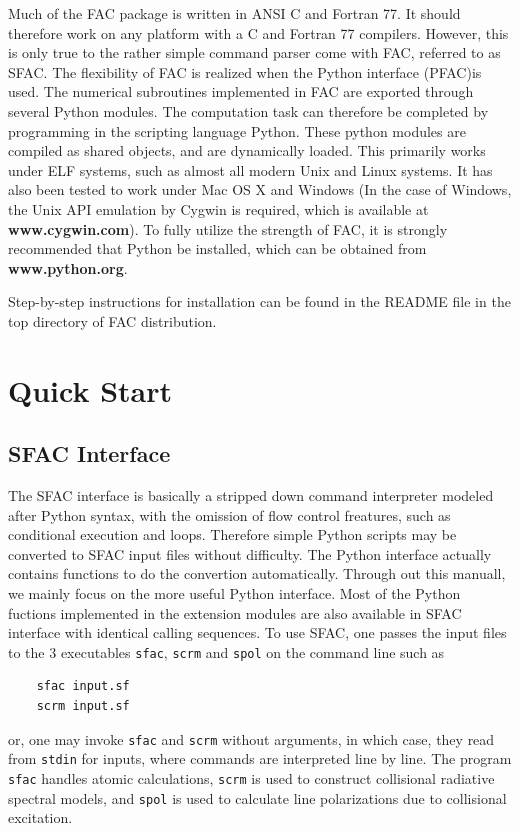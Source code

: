 \documentclass[twoside,letterpaper]{refrep}
\begin{document}
Much of the FAC package is written in ANSI C and Fortran 77. It should 
therefore work on any platform with a C and Fortran 77 compilers. However, 
this is only true to the rather simple command parser come with FAC, referred 
to as SFAC. The flexibility of FAC is realized when the Python interface
(PFAC)is used. The numerical subroutines implemented in FAC are exported
through several Python modules. The computation task can therefore be
completed by programming in the scripting language Python. These python
modules are compiled as shared objects, and are dynamically loaded. This
primarily works under ELF systems, such as almost all modern Unix and Linux
systems. It has also been tested to work under Mac OS X and Windows (In the
case of Windows, the Unix API emulation by Cygwin is required, which is
available at \textbf{www.cygwin.com}). To fully utilize the strength of  
FAC, it is strongly recommended that Python be installed, which can be obtained
from \textbf{www.python.org}.

Step-by-step instructions for installation can be found in the README file in
the top directory of FAC distribution.

\section{Quick Start}
\label{sec:start}
\subsection{SFAC Interface}
The SFAC interface is basically a stripped down command interpreter modeled
after Python syntax, with the omission of flow control freatures, such as
conditional execution and loops. Therefore simple Python scripts may be
converted to SFAC input files without difficulty. The Python interface
actually contains functions to do the convertion automatically. Through out
this manuall, we mainly focus on the more useful Python interface. Most of the
Python fuctions implemented in the extension modules are also available in
SFAC interface with identical calling sequences. To use SFAC, one passes the
input files to the 3 executables \verb|sfac|, \verb|scrm| and \verb|spol| on
the command line such as 
\begin{verbatim}
    sfac input.sf
    scrm input.sf
\end{verbatim}
or, one may invoke \verb|sfac| and \verb|scrm| without arguments, in which
case, they read from \verb|stdin| for inputs, where commands are interpreted
line by line. The program \verb|sfac| handles atomic calculations,
\verb|scrm| is used to construct collisional radiative spectral models, and 
\verb|spol| is used to calculate line polarizations due to collisional
excitation. 
\end{document}
